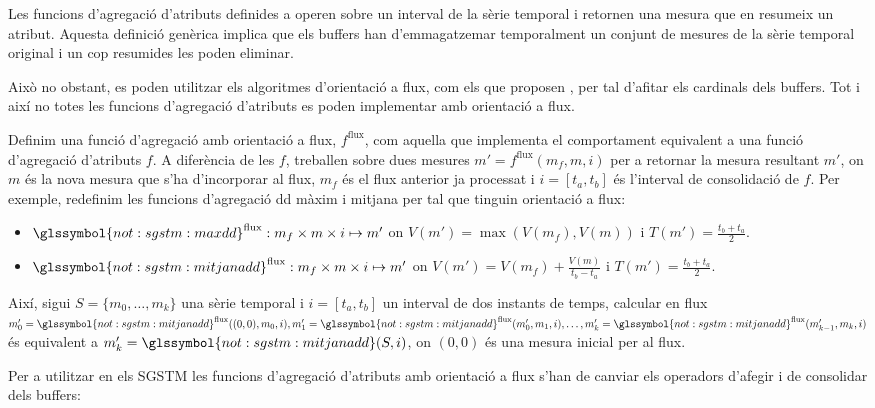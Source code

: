 Les funcions d'agregació d'atributs definides a
 operen sobre un interval de la sèrie
temporal i retornen una mesura que en resumeix un atribut. Aquesta
definició genèrica implica que els buffers han d'emmagatzemar
temporalment un conjunt de mesures de la sèrie temporal original i un
cop resumides les poden eliminar.

Això no obstant, es poden utilitzar els algoritmes d'orientació a
flux, com els que proposen \textcite{cormode08:pods}, per tal d'afitar
els cardinals dels buffers. Tot i així no totes les funcions
d'agregació d'atributs es poden implementar amb orientació a flux.




Definim una funció d'agregació amb orientació a flux, $f^\text{flux}$,
com aquella que implementa el comportament equivalent a una funció
d'agregació d'atributs $f$. A diferència de les $f$, treballen sobre
dues mesures $m'=f^\text{flux}(m_f,m,i)$ per a retornar la mesura
resultant $m'$, on $m$ és la nova mesura que s'ha d'incorporar al
flux, $m_f$ és el flux anterior ja processat i $i=[t_a,t_b]$ és
l'interval de consolidació de $f$.  Per exemple, redefinim les
funcions d'agregació \gls{dd} màxim i mitjana per tal que tinguin
orientació a flux:

\begin{itemize}
\item $\glssymbol{not:sgstm:maxdd}^\text{flux}: m_f \times m \times i \mapsto
  m'$ on $V(m')=\max(V(m_f),V(m))$ i $T(m')=\frac{t_b+t_a}{2}$. 


\item $\glssymbol{not:sgstm:mitjanadd}^\text{flux}: m_f \times m
  \times i \mapsto m'$ on $V(m') = V(m_f) + \frac{V(m)}{t_b-t_a}$ i
  $T(m')=\frac{t_b+t_a}{2}$.

\end{itemize}


Així, sigui $S=\{m_0,\dotsc,m_k\}$ una sèrie temporal i $i=[t_a,t_b]$
un interval de dos instants de temps, calcular en flux $m'_0 =
\glssymbol{not:sgstm:mitjanadd}^\text{flux}((0,0),m_0,i), m'_1 =
\glssymbol{not:sgstm:mitjanadd}^\text{flux}(m'_0,m_1,i), \dotsc, m'_k
= \glssymbol{not:sgstm:mitjanadd}^\text{flux}(m'_{k-1},m_k,i)$ és
equivalent a $m_k'=\glssymbol{not:sgstm:mitjanadd}(S,i)$, on $(0,0)$
és una mesura inicial per al flux.




Per a utilitzar en els \gls{SGSTM} les funcions d'agregació d'atributs
amb orientació a flux s'han de canviar els operadors d'afegir i de
consolidar dels buffers:



